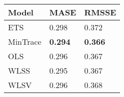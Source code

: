
\begin{tabular}{lll}

Model & MASE & RMSSE\\
\midrule
ETS & 0.298 & 0.372\\
MinTrace & \textbf{0.294} & \textbf{0.366}\\
OLS & 0.296 & 0.367\\
WLSS & 0.295 & 0.367\\
WLSV & 0.296 & 0.368\\

\end{tabular}